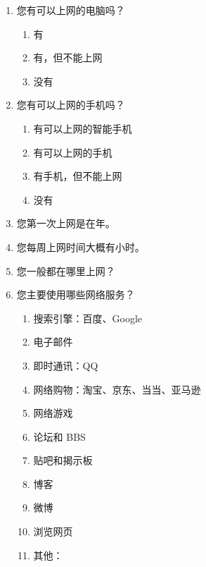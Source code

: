\begin{enumerate}
\item 您有可以上网的电脑吗？
  \begin{enumerate}
  \item 有
  \item 有，但不能上网
  \item 没有
  \end{enumerate}
\item 您有可以上网的手机吗？
  \begin{enumerate}
  \item 有可以上网的智能手机
  \item 有可以上网的手机
  \item 有手机，但不能上网
  \item 没有
  \end{enumerate}
\item 您第一次上网是在\underline{\makebox[5em][c]{}}年。
\item 您每周上网时间大概有\underline{\makebox[5em][c]{}}小时。
\item 您一般都在哪里上网？
  \\
\item 您主要使用哪些网络服务？
  \begin{enumerate}
  \item 搜索引擎：百度、Google
  \item 电子邮件
  \item 即时通讯：QQ
  \item 网络购物：淘宝、京东、当当、亚马逊
  \item 网络游戏
  \item 论坛和 BBS
  \item 贴吧和揭示板
  \item 博客
  \item 微博
  \item 浏览网页
  \item 其他：
  \end{enumerate}
\end{enumerate}

